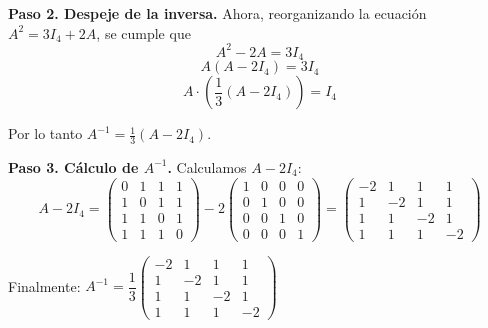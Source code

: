 \begin{prob}
\begin{myproof}
\textbf{Paso 2. Despeje de la inversa.} Ahora, reorganizando la ecuación $A^2 = 3I_4 + 2A$, se cumple que
\[
A^2 - 2A = 3I_4
\]
\[
A(A - 2I_4) = 3I_4
\]
\[
A \cdot \left( \frac{1}{3} (A - 2I_4) \right) = I_4
\]

Por lo tanto \(
A^{-1} = \frac{1}{3} (A - 2I_4).
\)

\textbf{Paso 3. Cálculo de $A^{-1}$.} Calculamos $A - 2I_4$:
\[
A - 2I_4 = \begin{pmatrix}
0 & 1 & 1 & 1 \\
1 & 0 & 1 & 1 \\
1 & 1 & 0 & 1 \\
1 & 1 & 1 & 0
\end{pmatrix} - 2 \begin{pmatrix}
1 & 0 & 0 & 0 \\
0 & 1 & 0 & 0 \\
0 & 0 & 1 & 0 \\
0 & 0 & 0 & 1
\end{pmatrix} = \begin{pmatrix}
-2 & 1 & 1 & 1 \\
1 & -2 & 1 & 1 \\
1 & 1 & -2 & 1 \\
1 & 1 & 1 & -2
\end{pmatrix}
\]

Finalmente: \(
\boxed{A^{-1} = \dfrac{1}{3} \begin{pmatrix}
-2 & 1 & 1 & 1 \\
1 & -2 & 1 & 1 \\
1 & 1 & -2 & 1 \\
1 & 1 & 1 & -2
\end{pmatrix}}
\)
\end{myproof}
\end{prob}

